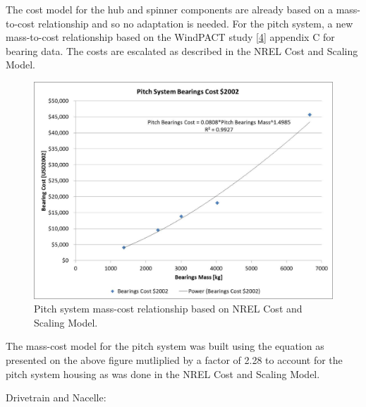 \documentclass[letterpaper,10pt,openany,oneside]{sphinxmanual}
\begin{document}
The cost model for the hub and spinner components are already based on a mass-to-cost relationship and so no adaptation is needed.  For the pitch system, a new mass-to-cost relationship based on the WindPACT study {\hyperref[theory:4]{{[}4{]}}} appendix C for bearing data.  The costs are escalated as described in the NREL Cost and Scaling Model.
\begin{figure}[htbp]
\centering
\capstart

\includegraphics[width=6.5in]{pitchCost.pdf}
\caption{Pitch system mass-cost relationship based on NREL Cost and Scaling Model.}\label{theory:pitchcost}\end{figure}

The mass-cost model for the pitch system was built using the equation as presented on the above figure mutliplied by a factor of 2.28 to account for the pitch system housing as was done in the NREL Cost and Scaling Model.

Drivetrain and Nacelle:
\end{document}

